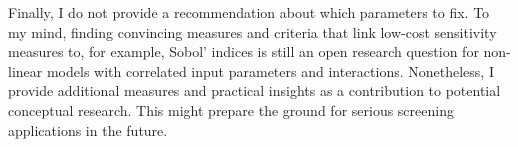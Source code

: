 \noindent
Finally, I do not provide a recommendation about which parameters to fix. To my mind, finding convincing measures and criteria that link low-cost sensitivity measures to, for example, Sobol' indices is still an open research question for non-linear models with correlated input parameters and interactions. Nonetheless, I provide additional measures and practical insights as a contribution to potential conceptual research. This might prepare the ground for serious screening applications in the future.




